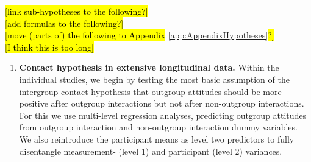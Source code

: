\documentclass[man, 12pt, a4paper, mask]{apa7}
\theoremstyle{break}
\theoremstyle{plain}
\begin{document}
\hl{[link sub-hypotheses to the following?]}\\
\hl{[add formulas to the following?]}\\
\hl{[move (parts of) the following to Appendix }\ref{app:AppendixHypotheses}\hl{?]}\\
\hl{[I think this is too long]}

\begin{enumerate}
    \item \textbf{Contact hypothesis in extensive longitudinal data.} Within the individual studies, we begin by testing the most basic assumption of the intergroup contact hypothesis that outgroup attitudes should be more positive after outgroup interactions but not after non-outgroup interactions. For this we use multi-level regression analyses, predicting outgroup attitudes from outgroup interaction and non-outgroup interaction dummy variables. We also reintroduce the participant means as level two predictors to fully disentangle measurement- (level 1) and participant (level 2) variances.
    

\end{enumerate}
\end{document}

